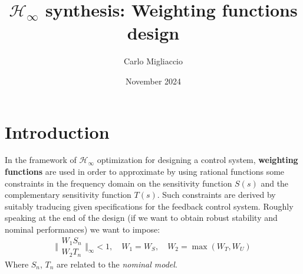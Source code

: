 \documentclass[a4paper, 12pt]{article}
\title{\textbf{$\mathcal{H}_\infty$ synthesis: Weighting functions design }}
\author{Carlo Migliaccio
}
\date{November 2024}
\begin{document}
    \maketitle

    \section{Introduction}
    In the framework of $\mathcal{H}_\infty$ optimization for designing a control system, \textbf{weighting functions} are used in order to approximate by using rational functions some constraints in the frequency domain on the sensitivity function $S(s)$ and the complementary sensitivity function $T(s)$. Such constraints are derived by suitably traducing given specifications for the feedback control system. Roughly speaking at the end of the design (if we want to obtain robust stability and nominal performances) we want to impose: 
\begin{equation}
        \Bigg\Vert 
        \begin{aligned}
            W_1 S_n\\
            W_2 T_n
        \end{aligned}
        \Bigg\Vert_\infty < 1, \quad W_1=W_S, \quad 
        W_2=\max(W_T, W_U)
    \end{equation}
    Where $S_n$, $T_n$ are related to the \textit{nominal model}.
\end{document}
